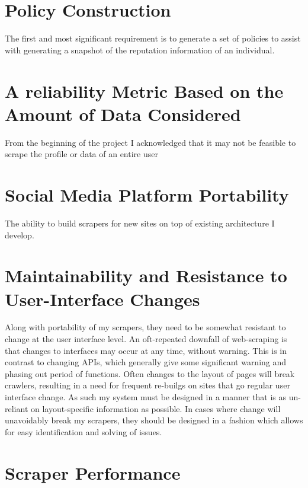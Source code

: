 \section{Policy Construction}

The first and most significant requirement is to generate a set of policies to assist with generating a snapshot of the reputation information of an individual. 

\section{A reliability Metric Based on the Amount of Data Considered}%

From the beginning of the project I acknowledged that it may not be feasible to scrape the profile or data of an entire user 

\section{Social Media Platform Portability}%

The ability to build scrapers for new sites on top of existing architecture I develop.


\section{Maintainability and Resistance to User-Interface Changes}

Along with portability of my scrapers, they need to be somewhat resistant to change at the user interface level. An oft-repeated downfall of web-scraping is that changes to interfaces may occur at any time, without warning. This is in contrast to changing APIs, which generally give some significant warning and phasing out period of functions. Often changes to the layout of pages will break crawlers, resulting in a need for frequent re-builgs on sites that go regular user interface change. As such my system must be designed in a manner that is as un-reliant on layout-specific information as possible. In cases where change will unavoidably break my scrapers, they should be designed in a fashion which allows for easy identification and solving of issues.

\section{Scraper Performance}

